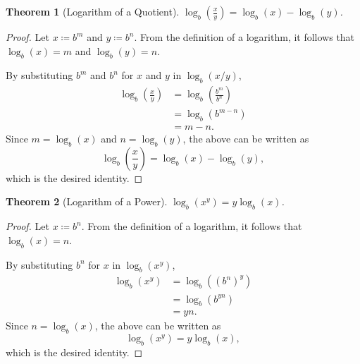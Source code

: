\documentclass[headings=standardclasses]{scrartcl}
\newtheorem{theorem}{Theorem}[subsection]
\theoremstyle{definition}
\begin{document}
\begin{theorem}[Logarithm of a Quotient]
  \(\displaystyle \log_{b}\left(\frac{x}{y}\right) = \log_{b}(x) -
  \log_{b}(y)\).
\end{theorem}

\begin{proof}
  Let \(x ≔ b^m\) and \(y ≔ b^n\). From the definition of a logarithm, it
  follows that \(\log_b(x) = m\) and \(\log_b(y) = n\).

  By substituting \(b^m\) and \(b^n\) for \(x\) and \(y\) in \(\log_b(x/y)\),
  \begin{equation*}
  \begin{split}
    \log_b\left(\frac{x}{y}\right) &= \log_b\left(\frac{b^m}{b^n}\right) \\
                                   &= \log_b(b^{m - n}) \\
                                   &= m - n.
  \end{split}
  \end{equation*}
  Since \(m = \log_b(x)\) and \(n = \log_b(y)\), the above can be written as
  \begin{equation*}
    \log_b\left(\frac{x}{y}\right) = \log_{b}(x) - \log_{b}(y),
  \end{equation*}
  which is the desired identity.
\end{proof}

\begin{theorem}[Logarithm of a Power]
  \(\displaystyle \log_{b}(x^y) = y\log_{b}(x)\).
\end{theorem}

\begin{proof}
  Let \(x ≔ b^n\). From the definition of a logarithm, it
  follows that \(\log_b(x) = n\).

  By substituting \(b^n\) for \(x\) in \(\log_b(x^y)\),
  \begin{equation*}
  \begin{split}
    \log_b(x^y) &= \log_b({(b^n)}^y) \\
                &= \log_b(b^{yn}) \\
                &= yn.
  \end{split}
  \end{equation*}
  Since \(n = \log_b(x)\), the above can be written as
  \begin{equation*}
    \log_b(x^y) = y\log_b(x),
  \end{equation*}
  which is the desired identity.
\end{proof}
\end{document}
